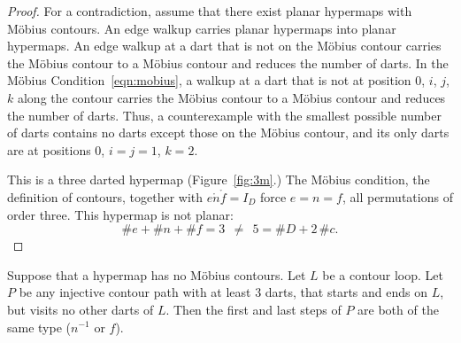 \begin{proof} For a contradiction, assume that there exist planar
hypermaps with M\"obius contours.  An edge walkup carries
planar hypermaps into planar hypermaps. An edge walkup
at a dart that is not on the M\"obius contour carries the
M\"obius contour to a M\"obius contour 
and reduces the number of darts.  
In the M\"obius Condition~\ref{eqn:mobius},
a walkup at a dart that is not at position $0$, $i$, $j$, $k$
along the contour carries the M\"obius contour to a M\"obius contour
and reduces the number of darts. Thus, a counterexample with
the smallest possible number of darts contains no
darts except those on the M\"obius contour, and its only darts
are at positions $0$, $i=j=1$, $k=2$.

This is a three darted hypermap (Figure~\ref{fig:3m}.)  
The M\"obius condition, the
definition of contours, together with $e\ocirc n\ocirc f=I_D$ force
$e=n=f$, all permutations of order three.  This hypermap is not planar:
\begin{displaymath}\# e + \# n + \# f = 3~~\ne~~ 5 = \# D + 2\,
\#c.\end{displaymath}
\end{proof}



%
%

\begin{lemma}
Suppose that a hypermap has no M\"obius contours. Let $L$ be a
contour loop.  Let $P$ be any injective contour path with at least
$3$ darts, that starts and ends on $L$, but visits no other darts of
$L$.  Then the first and last steps of $P$ are both of the same type
($n^{-1}$ or $f$).
\end{lemma}
%

